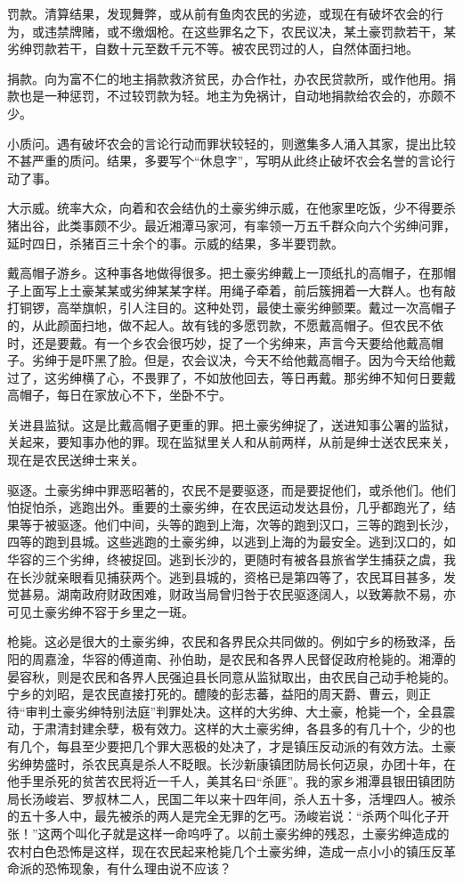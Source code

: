 罚款。清算结果，发现舞弊，或从前有鱼肉农民的劣迹，或现在有破坏农会的行为，或违禁牌赌，或不缴烟枪。在这些罪名之下，农民议决，某土豪罚款若干，某劣绅罚款若干，自数十元至数千元不等。被农民罚过的人，自然体面扫地。

捐款。向为富不仁的地主捐款救济贫民，办合作社，办农民贷款所，或作他用。捐款也是一种惩罚，不过较罚款为轻。地主为免祸计，自动地捐款给农会的，亦颇不少。

小质问。遇有破坏农会的言论行动而罪状较轻的，则邀集多人涌入其家，提出比较不甚严重的质问。结果，多要写个“休息字”，写明从此终止破坏农会名誉的言论行动了事。

大示威。统率大众，向着和农会结仇的土豪劣绅示威，在他家里吃饭，少不得要杀猪出谷，此类事颇不少。最近湘潭马家河，有率领一万五千群众向六个劣绅问罪，延时四日，杀猪百三十余个的事。示威的结果，多半要罚款。

戴高帽子游乡。这种事各地做得很多。把土豪劣绅戴上一顶纸扎的高帽子，在那帽子上面写上土豪某某或劣绅某某字样。用绳子牵着，前后簇拥着一大群人。也有敲打铜锣，高举旗帜，引人注目的。这种处罚，最使土豪劣绅颤栗。戴过一次高帽子的，从此颜面扫地，做不起人。故有钱的多愿罚款，不愿戴高帽子。但农民不依时，还是要戴。有一个乡农会很巧妙，捉了一个劣绅来，声言今天要给他戴高帽子。劣绅于是吓黑了脸。但是，农会议决，今天不给他戴高帽子。因为今天给他戴过了，这劣绅横了心，不畏罪了，不如放他回去，等日再戴。那劣绅不知何日要戴高帽子，每日在家放心不下，坐卧不宁。

关进县监狱。这是比戴高帽子更重的罪。把土豪劣绅捉了，送进知事公署的监狱，关起来，要知事办他的罪。现在监狱里关人和从前两样，从前是绅士送农民来关，现在是农民送绅士来关。

驱逐。土豪劣绅中罪恶昭著的，农民不是要驱逐，而是要捉他们，或杀他们。他们怕捉怕杀，逃跑出外。重要的土豪劣绅，在农民运动发达县份，几乎都跑光了，结果等于被驱逐。他们中间，头等的跑到上海，次等的跑到汉口，三等的跑到长沙，四等的跑到县城。这些逃跑的土豪劣绅，以逃到上海的为最安全。逃到汉口的，如华容的三个劣绅，终被捉回。逃到长沙的，更随时有被各县旅省学生捕获之虞，我在长沙就亲眼看见捕获两个。逃到县城的，资格已是第四等了，农民耳目甚多，发觉甚易。湖南政府财政困难，财政当局曾归咎于农民驱逐阔人，以致筹款不易，亦可见土豪劣绅不容于乡里之一斑。

枪毙。这必是很大的土豪劣绅，农民和各界民众共同做的。例如宁乡的杨致泽，岳阳的周嘉淦，华容的傅道南、孙伯助，是农民和各界人民督促政府枪毙的。湘潭的晏容秋，则是农民和各界人民强迫县长同意从监狱取出，由农民自己动手枪毙的。宁乡的刘昭，是农民直接打死的。醴陵的彭志蕃，益阳的周天爵、曹云，则正待“审判土豪劣绅特别法庭”判罪处决。这样的大劣绅、大土豪，枪毙一个，全县震动，于肃清封建余孽，极有效力。这样的大土豪劣绅，各县多的有几十个，少的也有几个，每县至少要把几个罪大恶极的处决了，才是镇压反动派的有效方法。土豪劣绅势盛时，杀农民真是杀人不眨眼。长沙新康镇团防局长何迈泉，办团十年，在他手里杀死的贫苦农民将近一千人，美其名曰“杀匪”。我的家乡湘潭县银田镇团防局长汤峻岩、罗叔林二人，民国二年以来十四年间，杀人五十多，活埋四人。被杀的五十多人中，最先被杀的两人是完全无罪的乞丐。汤峻岩说：“杀两个叫化子开张！”这两个叫化子就是这样一命呜呼了。以前土豪劣绅的残忍，土豪劣绅造成的农村白色恐怖是这样，现在农民起来枪毙几个土豪劣绅，造成一点小小的镇压反革命派的恐怖现象，有什么理由说不应该？

